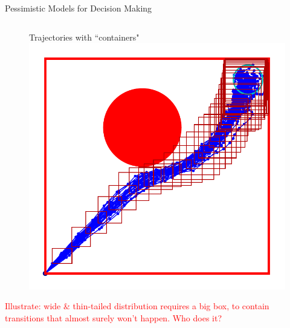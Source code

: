 \documentclass[lecture]{beamer}
\begin{document}
\begin{frame}{\normalsize Pessimistic Models for Decision Making}
\begin{columns}[t]
\begin{overlayarea}{\textwidth}{1\textheight}
\begin{figure}
{        }%
        {%
                \center
        Trajectories with ``containers"
   \includegraphics[width=\FS\textwidth]{Codes/BasicsSafety/PessimisticModel40.pdf}%
        }%
    \end{figure}
    \textcolor{red}{Illustrate: wide \& thin-tailed distribution requires a big box, to contain transitions that almost surely won't happen. Who does it?}
  \end{overlayarea} 



\end{columns}

  




\end{frame}

\end{document}
